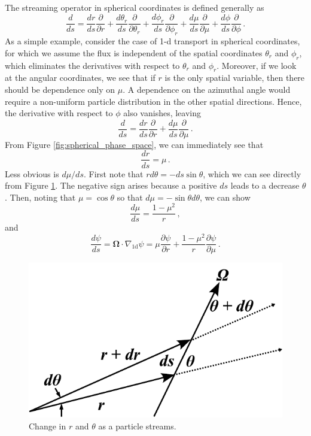 The streaming operator in spherical coordinates is defined generally as 
\begin{equation}
 \frac{d}{ds} = \frac{dr}{ds}\frac{\partial}{\partial r} + \frac{d\theta_r}{ds}\frac{\partial}{\partial \theta_r} + \frac{d\phi_r}{ds}\frac{\partial}{\partial \phi_r} + \frac{d\mu}{ds}\frac{\partial}{\partial \mu} + \frac{d\phi}{ds}\frac{\partial}{\partial \phi} \, .
\end{equation}
As a simple example, consider the case of 1-d transport in spherical coordinates, for which we assume the flux is independent of the spatial coordinates $\theta_{r}$ and $\phi_{r}$, which eliminates the derivatives with respect to $\theta_r$ and $\phi_r$.  Moreover, if we look at the angular coordinates, we see that if $r$ is the only spatial variable, then there should be dependence only on $\mu$.  A dependence on the azimuthal angle would require a non-uniform particle distribution in the other spatial directions.  Hence, the derivative with respect to $\phi$ also vanishes, leaving
\begin{equation}
 \frac{d}{ds} = \frac{dr}{ds}\frac{\partial}{\partial r} + \frac{d\mu}{ds}\frac{\partial}{\partial \mu}  \, .
\end{equation}
From Figure \ref{fig:spherical_phase_space}, we can immediately see that
\begin{equation}
 \frac{dr}{ds} = \mu \, .
 \label{eq:drds}
\end{equation}
Less obvious is $d\mu/ds$.  First note that $r d\theta = -ds \sin\theta$, which we can see directly from Figure \ref{fig:spherical_angle_with_r}.  The negative sign arises because a positive $ds$ leads to a decrease $\theta$. Then, noting that $\mu = \cos{\theta}$ so that $d\mu = -\sin{\theta} d\theta$, we can show
\begin{equation}
 \frac{d\mu}{ds} = \frac{1-\mu^2}{r} \, ,
 \label{eq:dmuds}
\end{equation}
and
\begin{equation}
 \frac{d\psi}{ds} = \mathbf{\Omega} \cdot \nabla_{\text{1d}} \psi = \mu \frac{\partial \psi}{\partial r} +  \frac{1-\mu^2}{r}\frac{\partial \psi}{\partial \mu} \, .
\end{equation}


\begin{figure}[ht] 
    \centering
    \includegraphics[keepaspectratio, width = 2.5 in]{images/spherical_angle_with_r}
    \caption{Change in $r$ and $\theta$ as a particle streams.}
    \label{fig:spherical_angle_with_r}
\end{figure}


